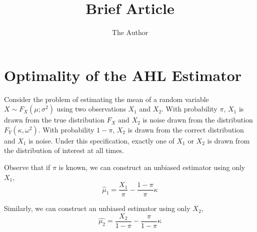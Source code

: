 \documentclass[11pt]{amsart}
\title{Brief Article}
\author{The Author}
\begin{document}
\maketitle
\doublespacing

\section{Optimality of the AHL Estimator}


Consider the problem of estimating the mean of a random variable $X \sim F_X(\mu; \sigma^2)$ using two observations $X_{1}$ and $X_{2}$.  With probability $\pi$, $X_1$ is drawn from the true distribution $F_X$ and $X_2$ is noise drawn from the distribution $F_Y(\kappa, \omega^2)$.  With probability $1-\pi$, $X_2$ is drawn from the correct distribution and $X_1$ is noise.  Under this specification, exactly one of $X_1$ or $X_2$ is drawn from the distribution of interest at all times.  

Observe that if $\pi$ is known, we can construct an unbiased estimator using only $X_1$,
\begin{equation}
\hat{\mu}_1 = \frac{X_1}{\pi} - \frac{1-\pi}{\pi} \kappa 
\label{mu1}
\end{equation} 

Similarly, we can construct an unbiased estimator using only $X_2$,
\begin{equation}\hat{\mu_2} = \frac{X_2}{1-\pi} - \frac{\pi}{1-\pi} \kappa \label{mu2} \end{equation}
\end{document}

